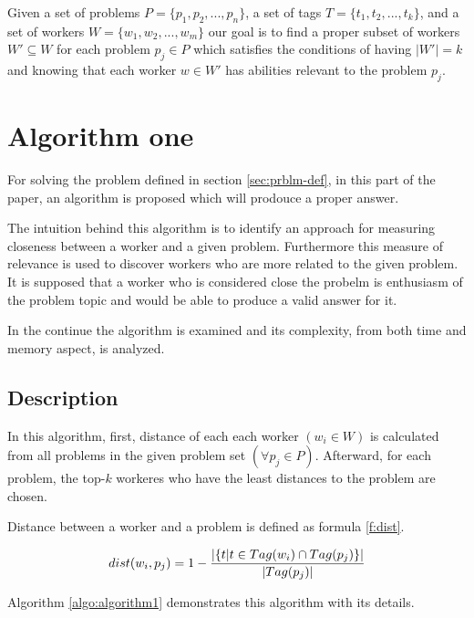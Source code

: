 \documentclass{template}
\begin{document}
Given a set of problems \(P = \{ p_1, p_2, ..., p_n \} \), a set of tags
\(T = \{ t_1, t_2, ..., t_k\} \),
and a set of workers \(W = \{w_1, w_2, ..., w_m \} \) our goal is to 
find a proper subset of workers \(W'  \subseteq W\) for each
problem \( p_j \in P \) which satisfies the conditions of having \(|W'| = k \) and knowing that 
each worker \(w \in W'\) has abilities relevant to the problem \(p_j\).

\section{Algorithm one}
\label{sec:algo-one}
For solving the problem defined in section \ref{sec:prblm-def}, in this part of the paper,
an algorithm is proposed which will prodouce a proper answer. 

The intuition behind this algorithm is to identify an approach for measuring closeness between 
a worker and a given problem. Furthermore this measure of relevance is used to discover workers
who are more related to the given problem. It is supposed that a worker who is considered close
the probelm is enthusiasm of the problem topic and would be able to produce a valid answer for it.

In the continue the algorithm is
examined and its complexity, from both time and memory aspect, is analyzed.

\subsection{Description}
In this algorithm, first, distance of each each worker \((w_i \in W)\) is calculated
from all problems in the given problem set \((\forall p_j \in P)\). Afterward, for each
problem, the top-\(k\) workeres who have the least distances to the problem are chosen. 

Distance between a worker and a problem is defined as formula \ref{f:dist}.

\begin{equation}
 dist(w_i, p_j) = 1 - {{|\{t | t \in Tag(w_i) \cap Tag(p_j)\}| \over {|Tag(p_j)|}}}
 \label{f:dist}
\end{equation}

Algorithm \ref{algo:algorithm1} demonstrates this algorithm with its details.
\end{document}
